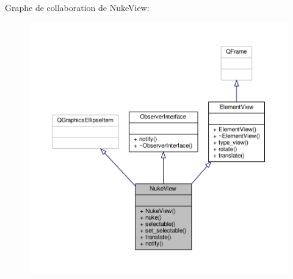 Graphe de collaboration de Nuke\+View\+:
\nopagebreak
\begin{figure}[H]
\begin{center}
\leavevmode
\includegraphics[width=350pt]{db/d47/classNukeView__coll__graph}
\end{center}
\end{figure}
